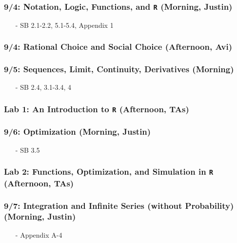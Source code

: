 \documentclass[11pt,letterpaper]{article}
\numberwithin{equation}{section}
\begin{document}
\subsubsection*{9/4: Notation, Logic, Functions, and {\tt R} (Morning, Justin)}
\begin{itemize}
\item[-] SB 2.1-2.2, 5.1-5.4, Appendix 1
\end{itemize}

\subsubsection*{9/4: Rational Choice and Social Choice (Afternoon, Avi)}


\subsubsection*{9/5: Sequences, Limit, Continuity, Derivatives (Morning)}

\begin{itemize}
\item[-] SB 2.4, 3.1-3.4, 4
\end{itemize}


\subsubsection*{Lab 1: An Introduction to {\tt R} (Afternoon, TAs)}




\subsubsection*{9/6: Optimization (Morning, Justin)}
\begin{itemize}
\item[-] SB 3.5
\end{itemize}

\subsubsection*{Lab 2: Functions, Optimization, and Simulation in {\tt R} (Afternoon, TAs)}



\subsubsection*{9/7: Integration and Infinite Series (without Probability) (Morning, Justin)}
\begin{itemize}
\item[-] Appendix A-4
\end{itemize}
\end{document}
